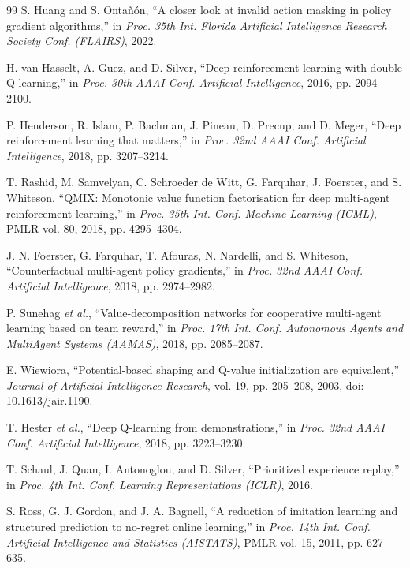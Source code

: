 \begin{thebibliography}{99}
S. Huang and S. Onta\~{n}\'{o}n, ``A closer look at invalid action masking in policy gradient
algorithms,'' in \emph{Proc. 35th Int. Florida Artificial Intelligence Research Society Conf.
(FLAIRS)}, 2022.

H. van Hasselt, A. Guez, and D. Silver, ``Deep reinforcement learning with double
Q-learning,'' in \emph{Proc. 30th AAAI Conf. Artificial Intelligence}, 2016, pp. 2094--2100.

P. Henderson, R. Islam, P. Bachman, J. Pineau, D. Precup, and D. Meger, ``Deep reinforcement
learning that matters,'' in \emph{Proc. 32nd AAAI Conf. Artificial Intelligence}, 2018,
pp. 3207--3214.

T. Rashid, M. Samvelyan, C. Schroeder de Witt, G. Farquhar, J. Foerster, and S. Whiteson,
``QMIX: Monotonic value function factorisation for deep multi-agent reinforcement
learning,'' in \emph{Proc. 35th Int. Conf. Machine Learning (ICML)}, PMLR vol. 80, 2018,
pp. 4295--4304.

J. N. Foerster, G. Farquhar, T. Afouras, N. Nardelli, and S. Whiteson, ``Counterfactual
multi-agent policy gradients,'' in \emph{Proc. 32nd AAAI Conf. Artificial Intelligence},
2018, pp. 2974--2982.

P. Sunehag \emph{et al.}, ``Value-decomposition networks for cooperative multi-agent learning
based on team reward,'' in \emph{Proc. 17th Int. Conf. Autonomous Agents and MultiAgent Systems
(AAMAS)}, 2018, pp. 2085--2087.

E. Wiewiora, ``Potential-based shaping and Q-value initialization are equivalent,''
\emph{Journal of Artificial Intelligence Research}, vol. 19, pp. 205--208, 2003,
doi: 10.1613/jair.1190.

T. Hester \emph{et al.}, ``Deep Q-learning from demonstrations,'' in \emph{Proc. 32nd AAAI
Conf. Artificial Intelligence}, 2018, pp. 3223--3230.

T. Schaul, J. Quan, I. Antonoglou, and D. Silver, ``Prioritized experience replay,'' in
\emph{Proc. 4th Int. Conf. Learning Representations (ICLR)}, 2016.

S. Ross, G. J. Gordon, and J. A. Bagnell, ``A reduction of imitation learning and structured
prediction to no-regret online learning,'' in \emph{Proc. 14th Int. Conf. Artificial
Intelligence and Statistics (AISTATS)}, PMLR vol. 15, 2011, pp. 627--635.


\end{thebibliography}
